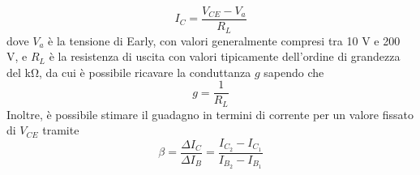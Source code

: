 \begin{equation}\label{eq:fit}
    I_C = \dfrac{V_{CE} - V_a}{R_L}
\end{equation}
dove $V_a$ è la tensione di Early, con valori generalmente compresi tra 10 \si{V} e 200 \si{V}, e $R_L$ è la resistenza di uscita con valori tipicamente dell'ordine di grandezza del \si{\kilo\ohm}, da cui è possibile ricavare la conduttanza $g$ sapendo che 
\begin{equation}\label{eq:conduttanza}
    g = \dfrac{1}{R_L}
\end{equation}
Inoltre, è possibile stimare il guadagno in termini di corrente per un valore fissato di $V_{CE}$ tramite 
\begin{equation}\label{eq:guadagno}
    \beta = \dfrac{\Delta I_C}{\Delta I_B} = \dfrac{I_{C_2} - I_{C_1}}{I_{B_2} - I_{B_1}}
\end{equation}
